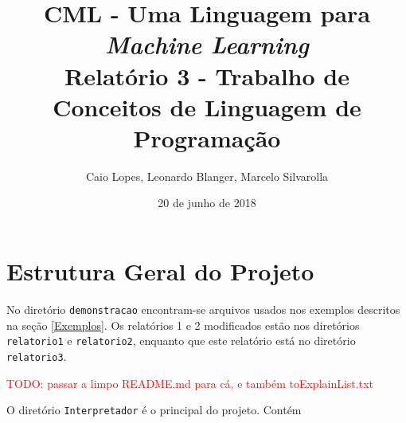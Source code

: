 \documentclass[12pt]{article}
\title{CML - Uma Linguagem para {\it Machine Learning} \\ \Large Relatório 3 - Trabalho de Conceitos de Linguagem de Programação}
\author{Caio Lopes, Leonardo Blanger, Marcelo Silvarolla}
\date{20 de junho de 2018}
\newcommand{\red}{\textcolor{red}}
\begin{document}
\lstset{
  basicstyle=\ttfamily,
  columns=fullflexible,
  keepspaces=true,
  mathescape
}

\maketitle
\tableofcontents
\newpage
\section{Estrutura Geral do Projeto}

No diretório \texttt{demonstracao} encontram-se arquivos usados nos exemplos descritos na seção \ref{Exemplos}. Os relatórios 1 e 2 modificados estão nos diretórios \texttt{relatorio1} e \texttt{relatorio2}, enquanto que este relatório está no diretório \texttt{relatorio3}.

\red{TODO: passar a limpo README.md para cá, e também toExplainList.txt}

O diretório \texttt{Interpretador} é o principal do projeto. Contém
\end{document}
